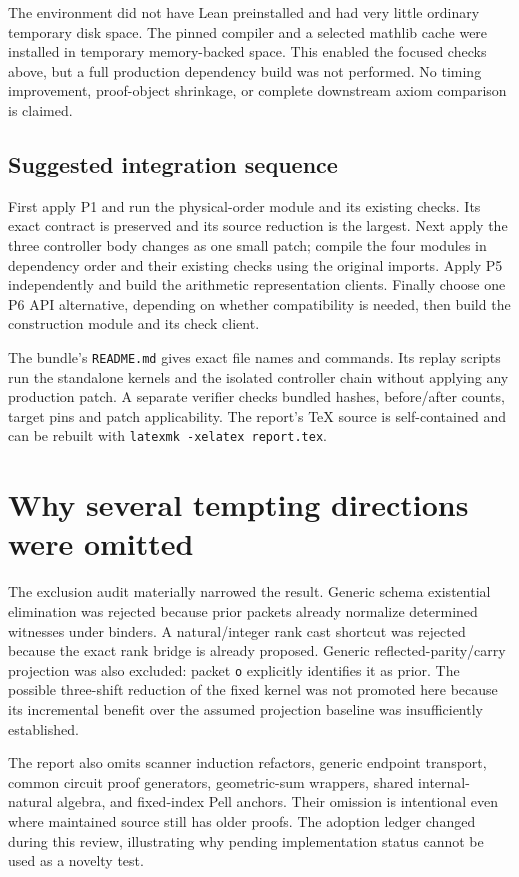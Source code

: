 \documentclass[11pt]{article}
\newcommand{\code}[1]{\nolinkurl{#1}}
\begin{document}
The environment did not have Lean preinstalled and had very little ordinary temporary disk space. The pinned compiler and a selected mathlib cache were installed in temporary memory-backed space. This enabled the focused checks above, but a full production dependency build was not performed. No timing improvement, proof-object shrinkage, or complete downstream axiom comparison is claimed.

\subsection*{Suggested integration sequence}

First apply P1 and run the physical-order module and its existing checks. Its exact contract is preserved and its source reduction is the largest. Next apply the three controller body changes as one small patch; compile the four modules in dependency order and their existing checks using the original imports. Apply P5 independently and build the arithmetic representation clients. Finally choose one P6 API alternative, depending on whether compatibility is needed, then build the construction module and its check client.

The bundle's \code{README.md} gives exact file names and commands. Its replay scripts run the standalone kernels and the isolated controller chain without applying any production patch. A separate verifier checks bundled hashes, before/after counts, target pins and patch applicability. The report's TeX source is self-contained and can be rebuilt with \code{latexmk -xelatex report.tex}.

\section{Why several tempting directions were omitted}

The exclusion audit materially narrowed the result. Generic schema existential elimination was rejected because prior packets already normalize determined witnesses under binders. A natural/integer rank cast shortcut was rejected because the exact rank bridge is already proposed. Generic reflected-parity/carry projection was also excluded: packet \code{o} explicitly identifies it as prior. The possible three-shift reduction of the fixed kernel was not promoted here because its incremental benefit over the assumed projection baseline was insufficiently established.

The report also omits scanner induction refactors, generic endpoint transport, common circuit proof generators, geometric-sum wrappers, shared internal-natural algebra, and fixed-index Pell anchors. Their omission is intentional even where maintained source still has older proofs. The adoption ledger changed during this review, illustrating why pending implementation status cannot be used as a novelty test.
\end{document}
